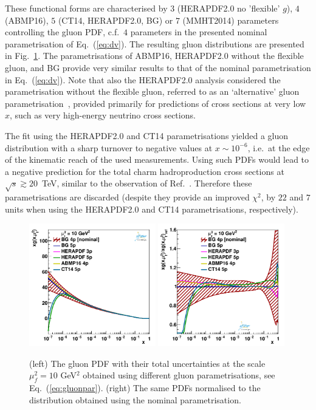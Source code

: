\documentclass[12pt]{article}
\begin{document}
These functional forms are characterised by $3$ (HERAPDF2.0 no 'flexible' $g$), $4$ (ABMP16), $5$ (CT14, HERAPDF2.0, BG) or $7$ (MMHT2014) parameters controlling the gluon PDF, c.f.\ $4$ parameters in the presented nominal parametrisation of Eq.~(\ref{eq:dv}). 
The resulting gluon distributions are presented in Fig.~\ref{fig:gluonpar}. The parametrisations of ABMP16, HERAPDF2.0 without the flexible gluon, and BG provide very similar results to that of the nominal parametrisation in Eq.~(\ref{eq:dv}). 
Note that also the HERAPDF2.0 analysis considered the parametrisation without the flexible gluon, referred to as an `alternative' gluon parametrisation~\cite{Abramowicz:2015mha}, provided primarily for predictions of cross sections at very low $x$, such as very high-energy neutrino cross sections.

The fit using the HERAPDF2.0 and CT14 parametrisations yielded a gluon distribution with a sharp turnover to negative values at $x \sim 10^{-6}$, i.e.\ at the edge of the kinematic reach of the used measurements. Using such PDFs would lead to a negative prediction for the total charm hadroproduction cross sections at $\sqrt{s} \gtrsim 20$~TeV, similar to the observation of Ref.~\cite{Accardi:2016ndt}. Therefore these parametrisations are discarded (despite they provide an improved $\chi^2$, by $22$ and $7$ units when using the HERAPDF2.0 and CT14 parametrisations, respectively).

\begin{figure}
    \centering
    \includegraphics[width=0.49\textwidth]{figs/gluonpar/q2_10_pdf_g.pdf}
    \includegraphics[width=0.49\textwidth]{figs/gluonpar/q2_10_pdf_g_ratio.pdf}
    \caption{(left) The gluon PDF with their total uncertainties at the scale $\mu^2_f=10$ GeV$^2$ obtained using different gluon parametrisations, see Eq.~(\ref{eq:gluonpar}). (right) The same PDFs normalised to the distribution obtained using the nominal parametrisation.}
    \label{fig:gluonpar}
\end{figure}
\end{document}
